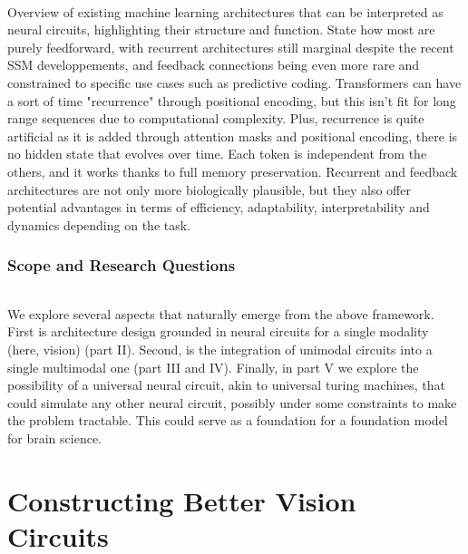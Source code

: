 \documentclass{article}
\begin{document}
\paragraph{}Overview of existing machine learning architectures that can be interpreted as neural circuits, highlighting their structure and function. State how most are purely feedforward, with recurrent architectures still marginal despite the recent SSM developpements, and feedback connections being even more rare and constrained to specific use cases such as predictive coding. Transformers can have a sort of time "recurrence" through positional encoding, but this isn't fit for long range sequences due to computational complexity. Plus, recurrence is quite artificial as it is added through attention masks and positional encoding, there is no hidden state that evolves over time. Each token is independent from the others, and it works thanks to full memory preservation. Recurrent and feedback architectures are not only more biologically plausible, but they also offer potential advantages in terms of efficiency, adaptability, interpretability and dynamics depending on the task.

\section{Scope and Research Questions}

\paragraph{}We explore several aspects that naturally emerge from the above framework. First is architecture design grounded in neural circuits for a single modality (here, vision) (part II). Second, is the integration of unimodal circuits into a single multimodal one (part III and IV). Finally, in part V we explore the possibility of a universal neural circuit, akin to universal turing machines, that could simulate any other neural circuit, possibly under some constraints to make the problem tractable. This could serve as a foundation for a foundation model for brain science.

\part{Constructing Better Vision Circuits} %
\end{document}

